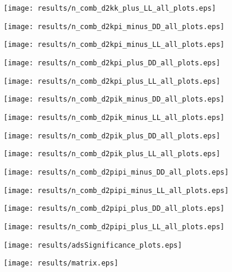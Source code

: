 \documentclass[11pt,a4paper]{article}
\begin{document}
\texttt{[image: results/n\_comb\_d2kk\_plus\_LL\_all\_plots.eps]}

\texttt{[image: results/n\_comb\_d2kpi\_minus\_DD\_all\_plots.eps]}

\texttt{[image: results/n\_comb\_d2kpi\_minus\_LL\_all\_plots.eps]}

\texttt{[image: results/n\_comb\_d2kpi\_plus\_DD\_all\_plots.eps]}

\texttt{[image: results/n\_comb\_d2kpi\_plus\_LL\_all\_plots.eps]}

\texttt{[image: results/n\_comb\_d2pik\_minus\_DD\_all\_plots.eps]}

\texttt{[image: results/n\_comb\_d2pik\_minus\_LL\_all\_plots.eps]}

\texttt{[image: results/n\_comb\_d2pik\_plus\_DD\_all\_plots.eps]}

\texttt{[image: results/n\_comb\_d2pik\_plus\_LL\_all\_plots.eps]}

\texttt{[image: results/n\_comb\_d2pipi\_minus\_DD\_all\_plots.eps]}

\texttt{[image: results/n\_comb\_d2pipi\_minus\_LL\_all\_plots.eps]}

\texttt{[image: results/n\_comb\_d2pipi\_plus\_DD\_all\_plots.eps]}

\texttt{[image: results/n\_comb\_d2pipi\_plus\_LL\_all\_plots.eps]}
\fi

\texttt{[image: results/adsSignificance\_plots.eps]}


\clearpage
\texttt{[image: results/matrix.eps]}
\end{document}
